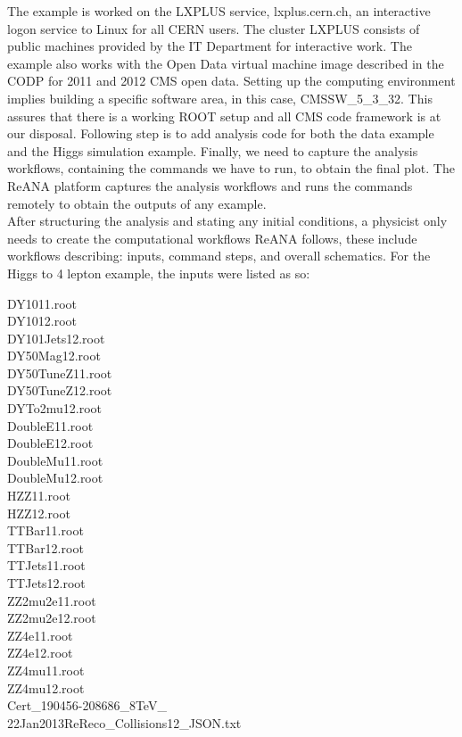 \documentclass[letter]{article}
\newcommand\tab[1][1cm]{\hspace*{#1}}
\begin{document}
\tab The example is worked on the LXPLUS service\cite{lxplus}, lxplus.cern.ch, an interactive logon service to Linux for all CERN users. The cluster LXPLUS consists of public machines provided by the IT Department for interactive work. The example also works with the Open Data virtual machine image  described in the CODP for 2011 and 2012 CMS open data\cite{codpvm}.
Setting up the computing environment implies building a specific software area, in this case, CMSSW\_5\_3\_32. This assures that there is a working ROOT setup and all CMS code framework is at our disposal. Following step is to add analysis code for both the data example and the Higgs simulation example. Finally, we need to capture the analysis workflows, containing the commands we have to run, to obtain the final plot. The ReANA platform captures the analysis workflows and runs the commands remotely to obtain the outputs of any example.\vspace{5pt}
\\
\tab After structuring the analysis and stating any initial conditions, a physicist only needs to create the computational workflows ReANA follows, these include workflows describing: inputs, command steps, and overall schematics. For the Higgs to 4 lepton example, the inputs were listed as so:
\begin{small}
\begin{multicols}{2}
\hspace{14pt}DY1011.root 
\\\tab DY1012.root
\\\tab DY101Jets12.root
\\\tab DY50Mag12.root
\\\tab DY50TuneZ11.root
\\\tab DY50TuneZ12.root
\\\tab DYTo2mu12.root
\\\tab DoubleE11.root
\\\tab DoubleE12.root
\\\tab DoubleMu11.root
\\\tab DoubleMu12.root
\\\tab HZZ11.root
\\\tab HZZ12.root
\\\tab TTBar11.root
\\\tab TTBar12.root
\\\tab TTJets11.root
\\\tab TTJets12.root
\\\tab ZZ2mu2e11.root
\\\tab ZZ2mu2e12.root
\\\tab ZZ4e11.root
\\\tab ZZ4e12.root
\\\tab ZZ4mu11.root
\\\tab ZZ4mu12.root
\\\tab Cert\_190456-208686\_8TeV\_\\\tab 22Jan2013ReReco\_Collisions12\_JSON.txt
\end{multicols} 
\end{small}
\end{document}
